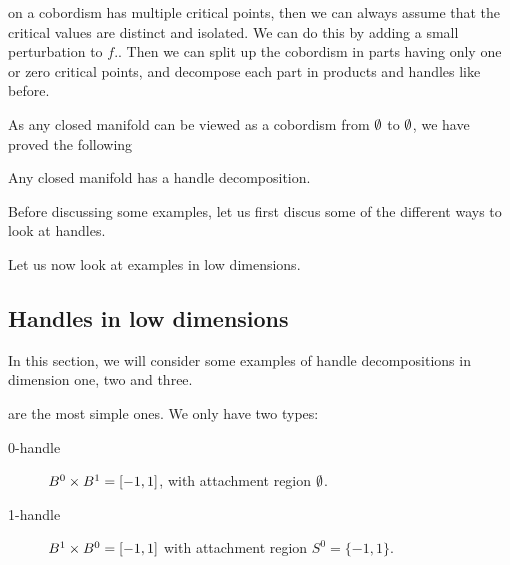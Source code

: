  on a cobordism has multiple critical points, then we can always assume that the critical values are distinct and isolated.
We can do this by adding a small perturbation to $f$..
Then we can split up the cobordism in parts having only one or zero critical points, and decompose each part in products and handles like before.

As any closed manifold can be viewed as a cobordism from $\emptyset$ to $\emptyset$, we have proved the following

\begin{theorem}
    Any closed manifold has a handle decomposition.
\end{theorem}

Before discussing some examples, let us first discus some of the different ways to look at handles.


Let us now look at examples in low dimensions.
\subsection{Handles in low dimensions}
In this section, we will consider some examples of handle decompositions in dimension one, two and three.

 are the most simple ones. We only have two types:

\begin{description}
    \item[0-handle] $B^{0} \times B^{1} = [-1, 1]$, with attachment region $\emptyset$. \hfill {} 
        
    \item[1-handle]   $B^{1} \times  B^{0} = [-1, 1]$ with attachment region $S^{0} = \{-1, 1\}$.  \hfill {}
\end{description}

